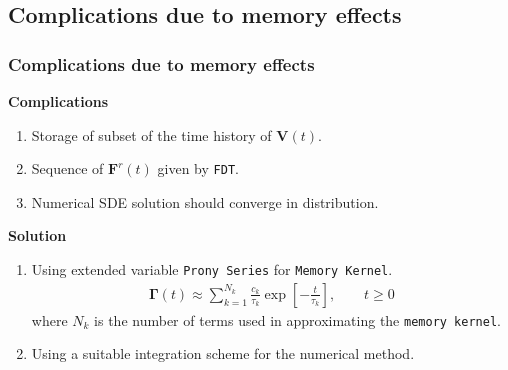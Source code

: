\documentclass[a4paper,10pt]{beamer}
\newcommand{\BS}[1]{\boldsymbol{#1}}
\newcommand{\sqb}[1]{\left[ #1 \right]}
\begin{document}
	\begin{frame}
		\subsection{Complications due to memory effects}
		\frametitle{Complications due to memory effects}
		\vspace{-0.8cm}
		\begin{minipage}[t]{0.44\textwidth}
			\begin{alertblock}{\textbf{Complications}}
				\begin{enumerate}
					\item {Storage of subset of the time history of $\BS{V}(t)$.}
					\item {Sequence of $\BS{F}^{r}(t)$ given by \texttt{FDT}.}
					\item {Numerical SDE solution should converge in distribution.}
				\end{enumerate}
			\end{alertblock}
		\end{minipage}
		\hfill
		\begin{minipage}[t]{0.52\textwidth}
			\centering
			\begin{exampleblock}{\textbf{Solution}}
				\begin{enumerate}
					\item {Using extended variable \texttt{Prony Series} for \texttt{Memory Kernel}.
					\scriptsize
					\begin{align}
					 \BS{\Gamma}(t) \approx \sum_{k=1}^{N_{k}} \frac{c_{k}}{\tau_{k}} \exp \sqb{-\frac{t}{\tau_{k}}}, \qquad t \geq 0 \end{align}
					\normalsize
					where $N_{k}$ is the number of terms used in approximating the \texttt{memory kernel}. }
					\item {Using a suitable integration scheme for the numerical method.}
				\end{enumerate}
			\end{exampleblock}
		\end{minipage}
	\end{frame}
\end{document}
